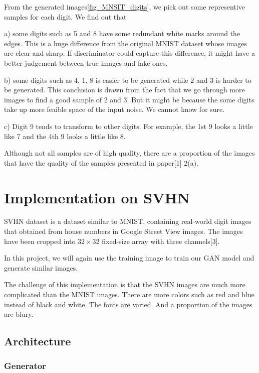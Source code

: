 \documentclass{article}
\begin{document}
From the generated images\ref{fig_MNSIT_digits}, we pick out some representive samples for each digit. We find out that 

a) some digits such as 5 and 8 have some redundant white marks around the edges. This is a huge difference from the original MNIST dataset whose images are clear and sharp. If discriminator could capture this difference, it might have a better judgement between true images and fake ones.

b) some digits such as 4, 1, 8 is easier to be generated while 2 and 3 is harder to be generated. This conclusion is drawn from the fact that we go through more images to find a good sample of 2 and 3. But it might be because the some digits take up more feaible space of the input noise. We cannot know for sure.

c) Digit 9 tends to transform to other digits. For example, the 1st 9 looks a little like 7 and the 4th 9 looks a little like 8.

Although not all samples are of high quality, there are a proportion of the images that have the quality of the samples presented in paper[1] 2(a).

\section{Implementation on SVHN}

SVHN dataset is a dataset similar to MNIST, containing real-world digit images that obtained from house numbers in Google Street View images.
The images have been cropped into $32\times 32$ fixed-size array with three channels[3].

In this project, we will again use the training image to train our GAN model and generate similar images.

The challenge of this implementation is that the SVHN images are much more complicated than the MNIST images. 
There are more colors such as red and blue instead of black and white. The fonts are varied. And a proportion of the images are blury.

\subsection{Architecture}

\subsubsection{Generator}
\end{document}
